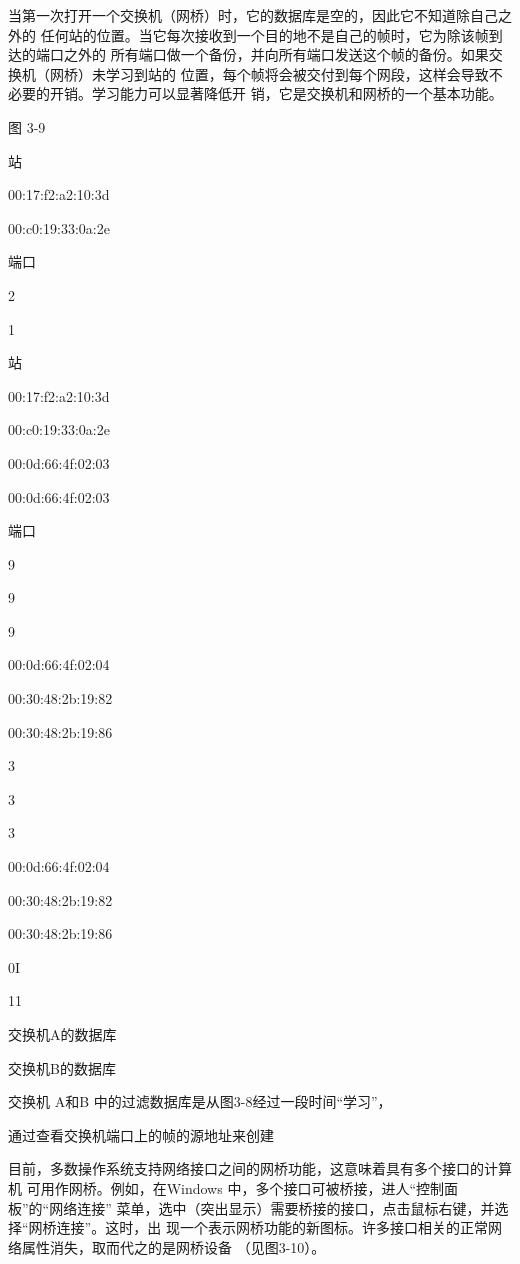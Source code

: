 当第一次打开一个交换机（网桥）时，它的数据库是空的，因此它不知道除自己之外的
任何站的位置。当它每次接收到一个目的地不是自己的帧时，它为除该帧到达的端口之外的
所有端口做一个备份，并向所有端口发送这个帧的备份。如果交换机（网桥）未学习到站的
位置，每个帧将会被交付到每个网段，这样会导致不必要的开销。学习能力可以显著降低开
销，它是交换机和网桥的一个基本功能。

图 3-9

站

00:17:f2:a2:10:3d

00:c0:19:33:0a:2e

端口

2

1

站

00:17:f2:a2:10:3d

00:c0:19:33:0a:2e

00:0d:66:4f:02:03

00:0d:66:4f:02:03

端口

9

9

9

00:0d:66:4f:02:04

00:30:48:2b:19:82

00:30:48:2b:19:86

3

3

3

00:0d:66:4f:02:04

00:30:48:2b:19:82

00:30:48:2b:19:86

0I

11

交换机A的数据库

交换机B的数据库

交换机 A和B 中的过滤数据库是从图3-8经过一段时间“学习”，

通过查看交换机端口上的帧的源地址来创建

目前，多数操作系统支持网络接口之间的网桥功能，这意味着具有多个接口的计算机
可用作网桥。例如，在Windows 中，多个接口可被桥接，进人“控制面板”的“网络连接”
菜单，选中（突出显示）需要桥接的接口，点击鼠标右键，并选择“网桥连接”。这时，出
现一个表示网桥功能的新图标。许多接口相关的正常网络属性消失，取而代之的是网桥设备
（见图3-10）。

